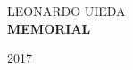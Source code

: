 \begin{titlepage}
    \begin{center}

        \begingroup
        \selectfont
        {\large LEONARDO UIEDA}
        \\[9.5cm]

        {\fontsize{40}{0}\selectfont \bfseries MEMORIAL}
        \vfill

        {\large 2017}
        \endgroup
    \end{center}
\end{titlepage}

